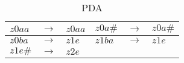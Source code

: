 \documentclass{article}
\begin{document}
\begin{table}[h!]
	\centering
	\caption{PDA}
	\begin{tabular}{|lcl|lcl|}
		\hline
		 $z0aa$ & $ \rightarrow $ & $z0aa$ & $z0a\#$ & $ \rightarrow $ & $z0a\#$ \\
		\hline
		 $z0ba$ & $ \rightarrow $ & $z1e$ & $z1ba$ & $ \rightarrow $ & $z1e$ \\
		\hline
		 $z1e\#$ & $ \rightarrow $ & $z2e$ & & &\\
		\hline
	\end{tabular}
\end{table}
\end{document}

